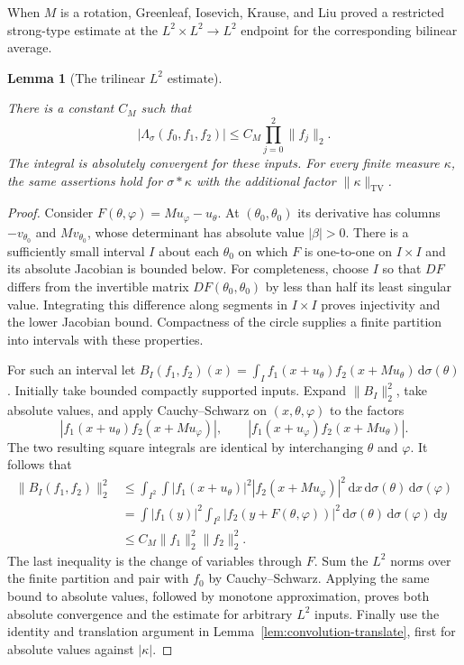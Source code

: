 \documentclass[11pt]{amsart}
\newcommand{\dd}{\,\mathrm d}
\DeclareMathOperator{\TV}{TV}
\newtheorem{lemma}[theorem]{Lemma}
\theoremstyle{definition}
\theoremstyle{remark}
\numberwithin{equation}{section}
\providecommand{\lean}[1]{}
\providecommand{\leanok}{}
\begin{document}
When $M$ is a rotation, Greenleaf, Iosevich, Krause, and Liu \cite{GIKL}
proved a restricted strong-type estimate at the $L^2\times L^2\to L^2$
endpoint for the corresponding bilinear average.

\begin{lemma}[The trilinear $L^2$ estimate]\label{lem:triple-l2}
\lean{Auto.lem_triple_l2,Auto.lem_triple_l2_sigma}
\leanok
There is a constant $C_M$ such that
\begin{equation}\label{eq:triple-l2}
 |\Lambda_\sigma(f_0,f_1,f_2)|
     \le C_M\prod_{j=0}^2\|f_j\|_2.
\end{equation}
The integral is absolutely convergent for these inputs.
For every finite measure $\kappa$, the same assertions hold
for $\sigma*\kappa$ with the additional factor
$\|\kappa\|_{\TV}$.
\end{lemma}
\begin{proof}
Consider $F(\theta,\varphi)=Mu_\varphi-u_\theta$.  At
$(\theta_0,\theta_0)$ its derivative has columns
$-v_{\theta_0}$ and $Mv_{\theta_0}$, whose determinant has
absolute value $|\beta|>0$.  There is a sufficiently small
interval $I$ about each $\theta_0$ on which $F$ is one-to-one
on $I\times I$ and its absolute Jacobian is bounded below.
For completeness, choose $I$ so that $DF$ differs from the
invertible matrix $DF(\theta_0,\theta_0)$ by less than half
its least singular value.  Integrating this difference along
segments in $I\times I$ proves injectivity and the lower
Jacobian bound.  Compactness of the circle supplies a finite
partition into intervals with these properties.

For such an interval let
$B_I(f_1,f_2)(x)=\int_I f_1(x+u_\theta)
 f_2(x+Mu_\theta)\dd\sigma(\theta)$.
Initially take bounded compactly supported inputs.  Expand
$\|B_I\|_2^2$, take absolute values, and apply Cauchy--Schwarz
on $(x,\theta,\varphi)$ to the factors
\[
 |f_1(x+u_\theta)f_2(x+Mu_\varphi)|,
 \qquad |f_1(x+u_\varphi)f_2(x+Mu_\theta)|.
\]
The two resulting square integrals are identical by interchanging
$\theta$ and $\varphi$.  It follows that
\begin{align*}
 \|B_I(f_1,f_2)\|_2^2
 &\le\int_{I^2}\int
      |f_1(x+u_\theta)|^2|f_2(x+Mu_\varphi)|^2
                 \dd x\dd\sigma(\theta)\dd\sigma(\varphi)\\
 &=\int |f_1(y)|^2
       \int_{I^2}|f_2(y+F(\theta,\varphi))|^2
                     \dd\sigma(\theta)\dd\sigma(\varphi)\dd y\\
 &\le C_M\|f_1\|_2^2\|f_2\|_2^2.
\end{align*}
The last inequality is the change of variables through $F$.
Sum the $L^2$ norms over the finite partition and pair with
$f_0$ by Cauchy--Schwarz.  Applying the same bound to absolute
values, followed by monotone approximation, proves both absolute
convergence and the estimate for arbitrary $L^2$ inputs.
Finally use the identity and translation argument in
Lemma~\ref{lem:convolution-translate}, first for absolute
values against $|\kappa|$.
\end{proof}
\end{document}
